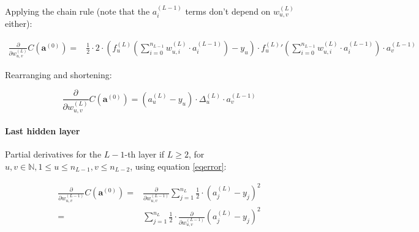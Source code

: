 \documentclass[titlepage]{article}
\begin{document}
          Applying the chain rule (note that the $a_i^{(L-1)}$ terms don't
          depend on $w_{u,v}^{(L)}$ either):

          \begin{equation}
            \begin{split}
              \frac{\partial}{\partial w_{u,v}^{(L)}}
                C \left( \mathbf{a}^{(0)} \right)
                  = & \frac{1}{2}
                      \cdot
                      2
                      \cdot
                      \left(
                          f_{u}^{(L)} \left(
                            \sum_{i=0}^{n_{L-1}}
                              w_{u,i}^{(L)} \cdot a_{i}^{(L-1)}
                          \right)
                          - y_{u}
                        \right)
                      \cdot
                        {f_{u}^{(L)}}' \left(
                          \sum_{i=0}^{n_{L-1}}
                            w_{u,i}^{(L)} \cdot a_{i}^{(L-1)}
                        \right)
                      \cdot
                        a_{v}^{(L-1)}
            \end{split}
          \end{equation}

          Rearranging and shortening:

          \begin{equation}
            \frac{\partial}{\partial w_{u,v}^{(L)}}
              C \left( \mathbf{a}^{(0)} \right)
                = \left( a_{u}^{(L)} - y_{u} \right)
                  \cdot
                  \Delta_u^{(L)}
                  \cdot
                  a_{v}^{(L-1)}
          \end{equation}

        \paragraph{Last hidden layer}

          Partial derivatives for the $L - 1$-th layer if $L \geq 2$,
          for $u, v \in \mathbb{N}, 1 \leq u \leq n_{L-1}, v \leq n_{L-2}$,
          using equation \ref{eqerror}:

          \begin{equation}\label{eqlasthittenpartder0}
            \begin{split}
              \frac{\partial}{\partial w_{u,v}^{(L-1)}}
                C \left( \mathbf{a}^{(0)} \right)
                  = & \frac{\partial}{\partial w_{u,v}^{(L-1)}}
                        \sum_{j=1}^{n_L}
                          \frac{1}{2}
                          \cdot
                          \left( a_j^{(L)} - y_j \right)^2 \\
                  = & \sum_{j=1}^{n_L}
                        \frac{1}{2}
                        \cdot
                        \frac{\partial}{\partial w_{u,v}^{(L-1)}}
                          \left( a_j^{(L)} - y_j \right)^2
            \end{split}
          \end{equation}
\end{document}
